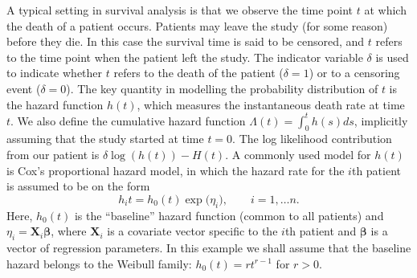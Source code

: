 \documentclass[12pt,letter,reqno]{book}
\begin{document}
\label{sec:kidney_example}
A typical setting in survival analysis is that we observe the time point $t$ at
which the death of a patient occurs. Patients may leave the study (for some
reason) before they die. In this case the survival time is said to be censored,
and $t$ refers to the time point when the patient left the study. The indicator
variable $\delta$ is used to indicate whether $t$ refers to the death of the
patient ($\delta=1$) or to a censoring event ($\delta=0$). The key quantity in
modelling the probability distribution of $t$ is the hazard function $h(t)$,
which measures the instantaneous death rate at time $t$. We also define the
cumulative hazard function $\Lambda(t)=\int_0^th(s)ds$, implicitly assuming that
the study started at time $t=0$. The log likelihood contribution from our
patient is $\delta\log(h(t))-H(t)$. A commonly used model for $h(t)$ is Cox's
proportional hazard model, in which the hazard rate for the $i$th patient is
assumed to be on the form
\[
  h_it = h_0(t)\exp(\eta_i\mathbf), \qquad i=1,\ldots n.
\]
Here, $h_0(t)$ is the ``baseline'' hazard function (common to all patients) and
$\eta_i=\mathbf{X}_i\mathbf{\beta}$, where $\mathbf{X}_i$ is a covariate vector
specific to the $i$th patient and $\mathbf{\beta}$ is a vector of regression
parameters. In this example we shall assume that the baseline hazard belongs to
the Weibull family: $h_0(t)=rt^{r-1}$ for $r>0$.
\end{document}

